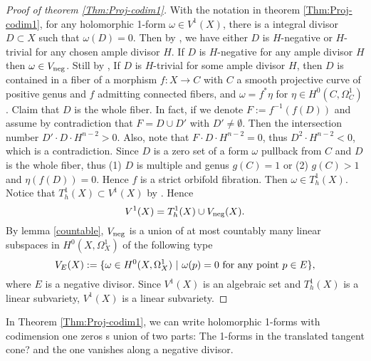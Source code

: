 \documentclass[a4paper,12pt,reqno]{amsart}
\theoremstyle{plain}
\theoremstyle{remark}
\begin{document}
\begin{proof}[Proof  of theorem \ref{Thm:Proj-codim1}]
With the notation in theorem \ref{Thm:Proj-codim1},  for any holomorphic 1-form $\omega\in V^1(X)$, there is a integral divisor $D\subset X$ such that $\omega(D)=0$. Then by \cite[theorem 2]{Sp88}, we have either $D$ is $H$-negative or $H$-trivial for any chosen ample divisor $H$. If $D$ is $H$-negative for any ample divisor $H$ then $\omega\in V_{\textnormal{neg}}$. Still by \cite[theorem 2]{Sp88}, If $D$ is $H$-trivial for some ample divisor $H$, then $D$ is contained in a fiber of a morphism $f: X\to C$ with $C$ a smooth projective curve of positive genus and $f$ admitting connected fibers, and $\omega=f^*\eta$ for $\eta\in H^0(C, \Omega_C^1)$. Claim that $D$ is the whole fiber. In fact, if we denote $F:=f^{-1}(f(D))$ and assume by contradiction that $F=D\cup D'$ with $D'\not=\emptyset$. Then the intersection number $D'\cdot D\cdot H^{n-2}>0$. Also, note that $F\cdot D\cdot H^{n-2}=0$, thus $D^2\cdot H^{n-2}<0$, which is a contradiction. Since $D$ is a zero set of a form $\omega$ pullback from $C$ and $D$ is the whole fiber, thus (1) $D$ is multiple and genus $g(C)=1$ or (2) $g(C)>1$ and $\eta(f(D))=0$. Hence $f$ is a strict orbifold fibration. Then $\omega\in T_h^1(X)$. Notice that $T_h^1(X)\subset V^1(X)$ by \cite{GL87}. Hence $$V^1(X)= T_h^1(X)\cup V_{\textnormal{neg}}(X).
$$
By lemma \ref{countable}, $V_{\textnormal{neg}}$ is a union of at most countably many linear subspaces in $H^0(X, \Omega_X^1)$ of the following type $$V_E(X):=\{\omega\in H^0(X, \Omega_X^1)\ |\ \omega(p)=0\  \textnormal{for any point}\ p\in E\},$$ where $E$ is a negative divisor. Since $V^1(X)$ is an algebraic set and $T_h^1(X)$ is a linear subvariety, $V^1(X)$ is a linear subvariety.
 \end{proof} 
 
 In Theorem \ref{Thm:Proj-codim1}, we can write holomorphic 1-forms with codimension one zeros s union of two parts: The 1-forms in the {\color{red} translated tangent cone?} and the one vanishes along a negative divisor.   
 
 
\end{document}
